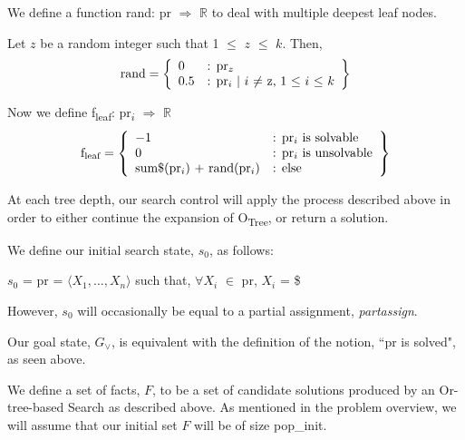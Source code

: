 \documentclass[11pt, oneside]{article}   	%
\newenvironment{cmr}{\fontfamily{cmr}\selectfont}{\par}
\begin{document}
\begin{cmr}
\noindent We define a function rand: pr $\Rightarrow$ $\mathbb{R}$ to deal with multiple deepest leaf nodes.

\noindent Let $z$ be a random integer such that 1 $\leq$ $z$ $\leq$ $k$. Then,\\
    \[
        \text{rand} = \left\{\begin{array}{ll}
            0 & \text{: pr\textsubscript{$z$}}\\
            0.5 & \text{: pr\textsubscript{$i$} $\vert$ $i$ $\neq$ z, 1 $\leq$ $i$ $\leq$ $k$}
            \end{array}\right\}
      \]

\end{cmr}
\noindent Now we define f\textsubscript{leaf}: pr\textsubscript{$i$} $\Rightarrow$ $\mathbb{R}$\\
    \[
        \text{f\textsubscript{leaf}} = \left\{\begin{array}{ll}
            -1 & \text{: pr\textsubscript{$i$} is solvable}\\
            0 & \text{: pr\textsubscript{$i$} is unsolvable}\\
            \text{sum$\$$(pr\textsubscript{$i$}) + rand(pr\textsubscript{$i$})} & \text{: else}
            \end{array}\right\}
      \]

\begin{cmr}
\noindent At each tree depth, our search control will apply the process described above in order to either continue the expansion of O\textsubscript{Tree}, or return a solution.
\end{cmr}


\noindent We define our initial search state, $s_0$, as follows:

\noindent \centerline{$s_0$ = pr = $\langle X_1, \dots, X_n\rangle$ such that, $\forall X_i$ $\in$ pr, $X_i$ = \$}

\noindent However, $s_0$ will occasionally be equal to a partial assignment, \textit{partassign}.

\noindent Our goal state, $G_{\lor}$, is equivalent with the definition of the notion, ``pr is solved", as seen above.\\
\newpage


\begin{cmr}
\noindent We define a set of facts, $F$, to be a set of candidate solutions produced by an Or-tree-based Search as described above.
As mentioned in the problem overview, we will assume that our initial set $F$ will be of size pop_init.
\end{cmr}
\end{document}
